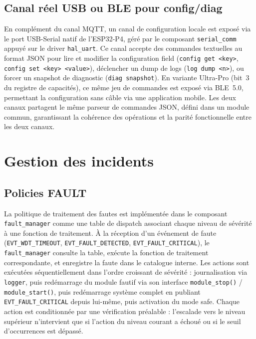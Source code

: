 \subsection{Canal réel USB ou BLE pour config/diag}
\label{subsec:canal_reel}

En complément du canal MQTT, un canal de configuration locale est
exposé via le port USB-Serial natif de l'ESP32-P4, géré par le
composant \texttt{serial\_comm} appuyé sur le driver \texttt{hal\_uart}.
Ce canal accepte des commandes textuelles au format JSON pour lire
et modifier la configuration field (\texttt{config get <key>},
\texttt{config set <key> <value>}), déclencher un dump de logs
(\texttt{log dump <n>}), ou forcer un snapshot de diagnostic
(\texttt{diag snapshot}). En variante Ultra-Pro (bit~3 du registre
de capacités), ce même jeu de commandes est exposé via BLE~5.0,
permettant la configuration sans câble via une application mobile.
Les deux canaux partagent le même parseur de commandes JSON, défini
dans un module commun, garantissant la cohérence des opérations et
la parité fonctionnelle entre les deux canaux.

\section{Gestion des incidents}
\label{sec:incidents}

\subsection{Policies FAULT}
\label{subsec:fault_pol}

La politique de traitement des fautes est implémentée dans le composant
\texttt{fault\_manager} comme une table de dispatch associant chaque
niveau de sévérité à une fonction de traitement. À la réception d'un
événement de faute (\texttt{EVT\_WDT\_TIMEOUT},
\texttt{EVT\_FAULT\_DETECTED}, \texttt{EVT\_FAULT\_CRITICAL}), le
\texttt{fault\_manager} consulte la table, exécute la fonction de
traitement correspondante, et enregistre la faute dans le catalogue
interne. Les actions sont exécutées séquentiellement dans l'ordre
croissant de sévérité : journalisation via \texttt{logger}, puis
redémarrage du module fautif via son interface \texttt{module\_stop()}
/ \texttt{module\_start()}, puis redémarrage système complet en
publiant \texttt{EVT\_FAULT\_CRITICAL} depuis lui-même, puis activation
du mode safe. Chaque action est conditionnée par une vérification
préalable : l'escalade vers le niveau supérieur n'intervient que si
l'action du niveau courant a échoué ou si le seuil d'occurrences
est dépassé.


